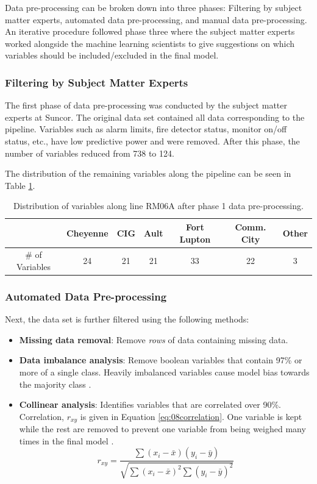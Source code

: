 Data pre-processing can be broken down into three phases: Filtering by subject matter experts, automated data pre-processing, and manual data pre-processing.  An iterative procedure followed phase three where the subject matter experts worked alongside the machine learning scientists to give suggestions on which variables should be included/excluded in the final model.

\subsubsection{Filtering by Subject Matter Experts}
The first phase of data pre-processing was conducted by the subject matter experts at Suncor.  The original data set contained all data corresponding to the pipeline.  Variables such as alarm limits, fire detector status, monitor on/off status, etc., have low predictive power and were removed.  After this phase, the number of variables reduced from 738 to 124.  

The distribution of the remaining variables along the pipeline can be seen in Table \ref{tab:08Ph1Data}.

\begin{table}[h]
    \centering
    {
    \begin{tabular}{ c | c | c | c | c | c | c}
             &  Cheyenne & CIG & Ault & Fort Lupton & Comm. City & Other      \\
        \hline
        \# of Variables  &  24  &  21  &  21  &  33  &  22  &  3  \\
    \end{tabular}}
    \caption{Distribution of variables along line RM06A after phase 1 data pre-processing.}
    \label{tab:08Ph1Data}
\end{table}

\subsubsection{Automated Data Pre-processing}
Next, the data set is further filtered using the following methods:

\begin{itemize}
    \item \textbf{Missing data removal}: Remove \textit{rows} of data containing missing data.
    \item \textbf{Data imbalance analysis}: Remove boolean variables that contain 97\% or more of a single class.  Heavily imbalanced variables cause model bias towards the majority class \cite{data_preprocessing}.
    \item \textbf{Collinear analysis}: Identifies variables that are correlated over 90\%. Correlation, $r_{xy}$ is given in Equation \ref{eq:08correlation}. One variable is kept while the rest are removed to prevent one variable from being weighed many times in the final model \cite{data_preprocessing}.
    \begin{equation}
        r_{xy} = \frac{\sum(x_i - \bar{x})(y_i - \bar{y})}{\sqrt{\sum(x_i - \bar{x})^2\sum(y_i-\bar{y})^2}}
        \label{eq:08correlation}
    \end{equation}
    
\end{itemize}

